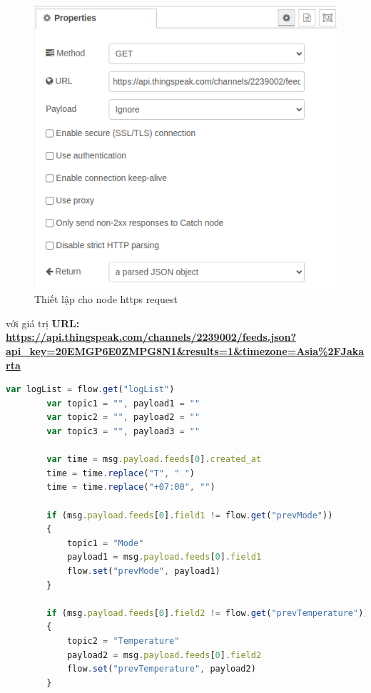 \documentclass{report}
\begin{document}
\begin{enumerate}
    \begin{figure}[H]
        \includegraphics[width=\textwidth, height=0.5\textheight, keepaspectratio]{img/flow/configure_request.png}
        \centering
        \caption{Thiết lập cho node https request}
    \end{figure}

    với giá trị \textbf{URL: \url{https://api.thingspeak.com/channels/2239002/feeds.json?api_key=20EMGP6E0ZMPG8N1&results=1&timezone=Asia\%2FJakarta}}
    \pagebreak
    \begin{lstlisting}[language=JavaScript, caption={function of control log list}]
        var logList = flow.get("logList")
        var topic1 = "", payload1 = ""
        var topic2 = "", payload2 = ""
        var topic3 = "", payload3 = ""

        var time = msg.payload.feeds[0].created_at
        time = time.replace("T", " ")
        time = time.replace("+07:00", "")

        if (msg.payload.feeds[0].field1 != flow.get("prevMode"))
        {
            topic1 = "Mode"
            payload1 = msg.payload.feeds[0].field1
            flow.set("prevMode", payload1)
        }

        if (msg.payload.feeds[0].field2 != flow.get("prevTemperature")) 
        {
            topic2 = "Temperature"
            payload2 = msg.payload.feeds[0].field2
            flow.set("prevTemperature", payload2)
        }


\end{lstlisting}
\end{enumerate}
\end{document}
